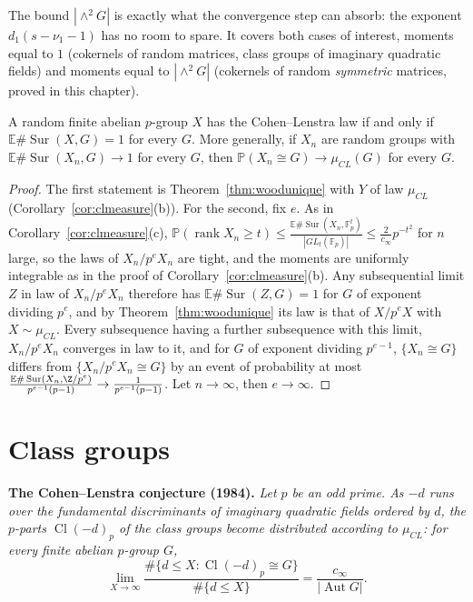 The bound $|\wedge^2G|$ is exactly what the convergence step can absorb: the exponent $d_1(s-\nu_1-1)$ has no room to spare. It covers both cases of interest, moments equal to $1$ (cokernels of random matrices, class groups of imaginary quadratic fields) and moments equal to $|\wedge^2G|$ (cokernels of random \emph{symmetric} matrices, proved in this chapter).

\begin{corollary}\label{cor:clcharacterize}
A random finite abelian $p$-group $X$ has the Cohen--Lenstra law if and only if $\mathbb E\#\operatorname{Sur}(X,G)=1$ for every $G$. More generally, if $X_n$ are random groups with $\mathbb E\#\operatorname{Sur}(X_n,G)\to1$ for every $G$, then $\mathbb P(X_n\cong G)\to\mu_{CL}(G)$ for every $G$.
\end{corollary}
\begin{proof}
The first statement is Theorem~\ref{thm:woodunique} with $Y$ of law $\mu_{CL}$ (Corollary~\ref{cor:clmeasure}(b)). For the second, fix $e$. As in Corollary~\ref{cor:clmeasure}(c), $\mathbb P(\operatorname{rank}X_n\ge t)\le\frac{\mathbb E\#\operatorname{Sur}(X_n,\mathbb F_p^t)}{|GL_t(\mathbb F_p)|}\le\frac2{c_\infty}p^{-t^2}$ for $n$ large, so the laws of $X_n/p^eX_n$ are tight, and the moments are uniformly integrable as in the proof of Corollary~\ref{cor:clmeasure}(b). Any subsequential limit $Z$ in law of $X_n/p^eX_n$ therefore has $\mathbb E\#\operatorname{Sur}(Z,G)=1$ for $G$ of exponent dividing $p^e$, and by Theorem~\ref{thm:woodunique} its law is that of $X/p^eX$ with $X\sim\mu_{CL}$. Every subsequence having a further subsequence with this limit, $X_n/p^eX_n$ converges in law to it, and for $G$ of exponent dividing $p^{e-1}$, $\{X_n\cong G\}$ differs from $\{X_n/p^eX_n\cong G\}$ by an event of probability at most $\frac{\mathbb E\#\operatorname{Sur}(X_n,\Z/p^e)}{p^{e-1}(p-1)}\to\frac1{p^{e-1}(p-1)}$. Let $n\to\infty$, then $e\to\infty$.
\end{proof}

\section{Class groups}

\medskip\noindent\textbf{The Cohen--Lenstra conjecture (1984).} \emph{Let $p$ be an odd prime. As $-d$ runs over the fundamental discriminants of imaginary quadratic fields ordered by $d$, the $p$-parts $\operatorname{Cl}(-d)_p$ of the class groups become distributed according to $\mu_{CL}$: for every finite abelian $p$-group $G$,
\[
\lim_{X\to\infty}\frac{\#\{d\le X:\operatorname{Cl}(-d)_p\cong G\}}{\#\{d\le X\}}=\frac{c_\infty}{|\operatorname{Aut}G|}.
\]}

